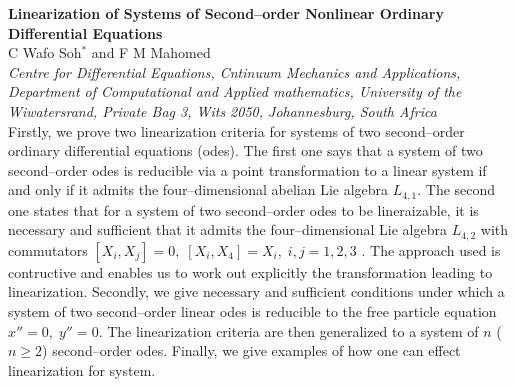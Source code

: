 

{\Large \bf Linearization of Systems of Second--order
Nonlinear Ordinary Differential Equations}\\


{\large \sc C Wafo Soh$^*$ and F M Mahomed}\\


{\em Centre for Differential Equations, Cntinuum Mechanics and Applications,
Department of Computational and Applied mathematics, University of the
Wiwatersrand, Private Bag 3, Wits 2050, Johannesburg, South Africa}\\


Firstly, we prove two linearization criteria for systems of
two second--order ordinary
differential equations (odes). The first one says that a system of two 
second--order odes is reducible via a point transformation to a linear system
if and only if it admits the four--dimensional abelian Lie algebra 
$L_{4,1}$. The second one states that for a system of
two second--order odes to be lineraizable, it is necessary and sufficient that
it admits the four--dimensional  Lie algebra
$L_{4,2}$ with commutators $[X_i,X_j]=0,\;[X_i,X_4]=X_i,\;i,j=1,2,3$
. The approach used is contructive and enables us to work out 
explicitly the transformation leading to linearization.
Secondly, we give necessary and sufficient conditions under which
a system of two second--order linear odes is reducible to the
free particle equation $x''=0,\;y''=0$. 
The linearization criteria  are then generalized to a system of $n$
($n\ge 2$) second--order odes. Finally, we give examples of how one can
effect linearization for system.



